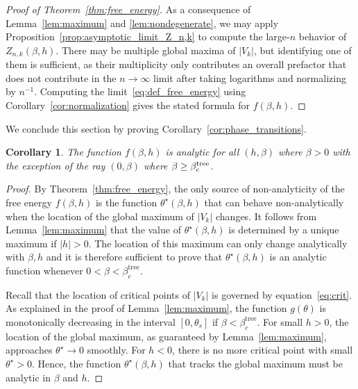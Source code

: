 \documentclass{article}
\numberwithin{theorem}{section}
\newtheorem{corollary}[theorem]{Corollary}
\theoremstyle{remark}
\begin{document}
\begin{proof}[Proof of Theorem~\ref{thm:free_energy}]
As a consequence of Lemma~\ref{lem:maximum} and \ref{lem:nondegenerate}, we may apply Proposition~\ref{prop:asymptotic_limit_Z_n,k} to
compute the large-$n$ behavior of $Z_{n,k}(\beta,h)$.
There may be multiple global maxima of $|V_k|$, but identifying one of them is sufficient, as their multiplicity only contributes an overall prefactor that does not contribute in the $n\rightarrow \infty$ limit after taking logarithms and normalizing by $n^{-1}$.
Computing the limit~\eqref{eq:def_free_energy} using Corollary~\ref{cor:normalization} gives the stated formula for $f(\beta,h)$.
\end{proof}

We conclude this section by proving Corollary~\ref{cor:phase_transitions}.

\begin{corollary}
  \label{cor:smoothf}
    The function $f(\beta,h)$ is analytic for all $(h,\beta)$ where $\beta > 0$
    with the exception of the ray $(0,\beta)$ where $\beta \geq \beta_c^{\rm tree}$.
\end{corollary}

\begin{proof}
  By Theorem~\ref{thm:free_energy}, the only source of non-analyticity of the free energy $f(\beta,h)$ is 
  the function $\theta^\star(\beta,h)$ that can behave non-analytically when the location of the global maximum of $|V_k|$ changes.
  It follows from Lemma~\ref{lem:maximum} that the value of $\theta^\star(\beta,h)$ is 
  determined by a unique maximum if $|h| > 0$. The location of this maximum can only change 
  analytically with $\beta,h$ and it is therefore sufficient to prove that $\theta^\star(\beta,h)$ is an analytic function whenever $0<\beta < \beta_c^\mathrm{tree}$.

  Recall that the location of critical points of $|V_k|$ is governed by equation~\eqref{eq:crit}.
  As explained in the proof of Lemma~\ref{lem:maximum}, the function $g(\theta)$ is monotonically decreasing in the interval $[0,\theta_s]$ if $\beta < \beta_c^\mathrm{tree}$.
  For small $h >0$, the location of the global maximum, as guaranteed by Lemma~\ref{lem:maximum}, approaches $\theta^\star \to 0$ smoothly. For $h < 0$, there is no more critical point with small $\theta^\star >0$.
  Hence, the function $\theta^\star(\beta,h)$ that tracks the global maximum 
  must be analytic in $\beta$ and $h$.
\end{proof}
\end{document}

